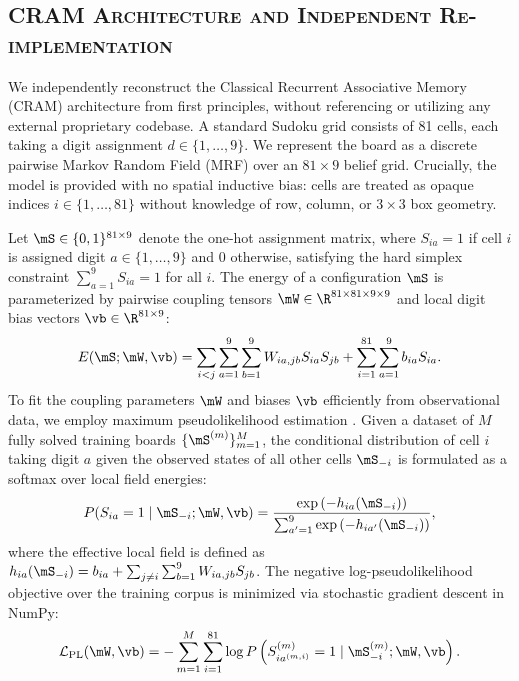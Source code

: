 \documentclass{article} %
\begin{document}
\subsection{\textsc{CRAM Architecture and Independent Re-implementation}}
\label{subsec:cram_reimplementation}

We independently reconstruct the Classical Recurrent Associative Memory (CRAM) architecture from first principles, without referencing or utilizing any external proprietary codebase. A standard Sudoku grid consists of 81 cells, each taking a digit assignment $d \in \{1, \dots, 9\}$. We represent the board as a discrete pairwise Markov Random Field (MRF) over an $81 \times 9$ belief grid. Crucially, the model is provided with no spatial inductive bias: cells are treated as opaque indices $i \in \{1, \dots, 81\}$ without knowledge of row, column, or $3 \times 3$ box geometry.

Let $\mS \in \{0, 1\}^{81 \times 9}$ denote the one-hot assignment matrix, where $S_{ia} = 1$ if cell $i$ is assigned digit $a \in \{1, \dots, 9\}$ and $0$ otherwise, satisfying the hard simplex constraint $\sum_{a=1}^9 S_{ia} = 1$ for all $i$. The energy of a configuration $\mS$ is parameterized by pairwise coupling tensors $\mW \in \R^{81 \times 81 \times 9 \times 9}$ and local digit bias vectors $\vb \in \R^{81 \times 9}$:
\begin{equation}
    E(\mS; \mW, \vb) = \sum_{i < j} \sum_{a=1}^9 \sum_{b=1}^9 W_{ia, jb} S_{ia} S_{jb} + \sum_{i=1}^{81} \sum_{a=1}^9 b_{ia} S_{ia}.
    \label{eq:energy_function}
\end{equation}
To fit the coupling parameters $\mW$ and biases $\vb$ efficiently from observational data, we employ maximum pseudolikelihood estimation \citep{Bresler2014EfficientlyLearning}. Given a dataset of $M$ fully solved training boards $\{\mS^{(m)}\}_{m=1}^M$, the conditional distribution of cell $i$ taking digit $a$ given the observed states of all other cells $\mS_{-i}$ is formulated as a softmax over local field energies:
\begin{equation}
    P(S_{ia} = 1 \mid \mS_{-i}; \mW, \vb) = \frac{\exp\left( -h_{ia}(\mS_{-i}) \right)}{\sum_{a'=1}^9 \exp\left( -h_{ia'}(\mS_{-i}) \right)},
    \label{eq:conditional_prob}
\end{equation}
where the effective local field is defined as $h_{ia}(\mS_{-i}) = b_{ia} + \sum_{j \neq i} \sum_{b=1}^9 W_{ia, jb} S_{jb}$. The negative log-pseudolikelihood objective over the training corpus is minimized via stochastic gradient descent in NumPy:
\begin{equation}
    \mathcal{L}_{\mathrm{PL}}(\mW, \vb) = - \sum_{m=1}^M \sum_{i=1}^{81} \log P\left(S_{ia^{(m, i)}}^{(m)} = 1 \mid \mS_{-i}^{(m)}; \mW, \vb\right).
    \label{eq:pseudolikelihood_loss}
\end{equation}
\end{document}
